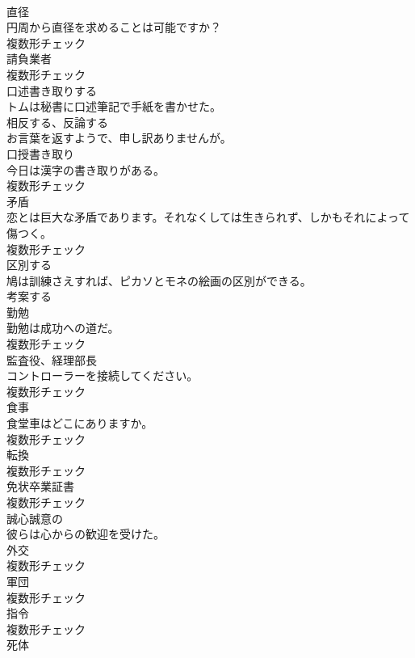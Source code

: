 \documentclass[8pt]{extreport}
\begin{document}
\begin{CJK}{UTF8}{min}
\\	[名詞]	直径	
\\	円周から直径を求めることは可能ですか？	
\\	複数形チェック
\\	[名詞]	請負業者	
\\	複数形チェック
\\	[動詞]	口述書き取りする	
\\	トムは秘書に口述筆記で手紙を書かせた。	
\\	[動詞]	相反する、反論する	
\\	お言葉を返すようで、申し訳ありませんが。	
\\	[名詞]	口授書き取り	
\\	今日は漢字の書き取りがある。	
\\	複数形チェック
\\	[名詞]	矛盾	
\\	恋とは巨大な矛盾であります。それなくしては生きられず、しかもそれによって傷つく。	
\\	複数形チェック
\\	[動詞]	区別する	
\\	鳩は訓練さえすれば、ピカソとモネの絵画の区別ができる。	
\\	[動詞]	考案する	
\\	[名詞]	勤勉	
\\	勤勉は成功への道だ。	
\\	複数形チェック
\\	[名詞]	監査役、経理部⻑	
\\	コントローラーを接続してください。	
\\	複数形チェック
\\	[名詞]	食事	
\\	食堂車はどこにありますか。	
\\	複数形チェック
\\	[名詞]	転換	
\\	複数形チェック
\\	[名詞]	免状卒業証書	
\\	複数形チェック
\\	[形容詞]	誠心誠意の	
\\	彼らは心からの歓迎を受けた。	
\\	[名詞]	外交	
\\	複数形チェック
\\	[名詞]	軍団	
\\	複数形チェック
\\	[名詞]	指令	
\\	複数形チェック
\\	[名詞]	死体	

\end{CJK}
\end{document}
